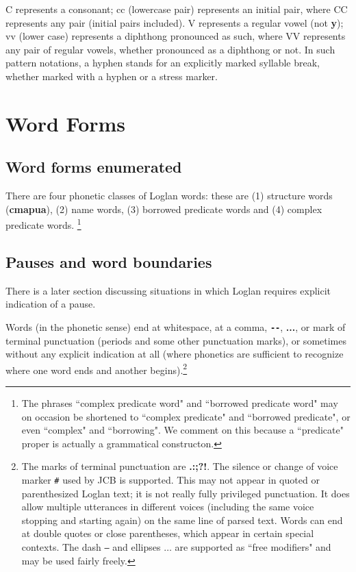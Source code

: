 \documentclass[12pt]{book}
\begin{document}
C represents a consonant; cc (lowercase pair) represents an initial pair, where CC represents any pair (initial pairs included).  V represents a regular vowel (not {\bf y}); vv (lower case) represents a diphthong pronounced as such, where VV represents any pair of regular vowels, whether pronounced as a diphthong or not.  In such pattern notations, a hyphen stands for an explicitly marked syllable break, whether marked with a hyphen or a stress marker.

\section{Word Forms}

\subsection{Word forms enumerated}

There are four phonetic classes of Loglan words:  these are (1) structure words ({\bf cmapua}), (2) name words, (3) borrowed predicate words and (4) complex predicate words.  \footnote{The phrases ``complex predicate word" and ``borrowed predicate word" may on occasion be shortened to ``complex predicate"
and ``borrowed predicate", or even ``complex" and ``borrowing".  We comment on this because a ``predicate" proper is actually a grammatical constructon.}

\subsection{Pauses and word boundaries}


There is a later section discussing situations in which Loglan requires explicit indication of a pause.


Words (in the phonetic sense) end at whitespace, at a comma, {\bf \verb|--|}, {\bf...}, or mark of terminal punctuation (periods and some other punctuation marks), or sometimes without any explicit indication at all (where phonetics are sufficient to recognize where one word ends and another begins).\footnote{The marks of terminal punctuation are {\bf .:;?!}.  
The silence or change of voice marker {\tt \#} used by JCB is supported.   This may not appear in quoted or parenthesized Loglan text; it is not really fully privileged punctuation.  It does allow multiple utterances in different voices (including the same voice stopping and starting again) on the same line of parsed text.  Words can end at double quotes or close parentheses, which appear in certain special contexts.  The dash {\tt --} and ellipses $\ldots$ are supported as ``free modifiers" and may be used fairly freely.}
\end{document}
